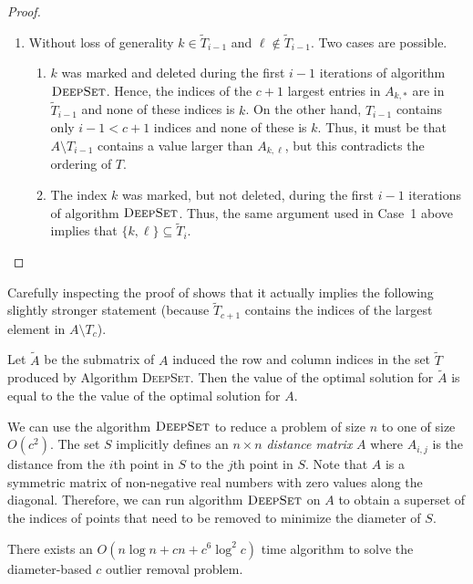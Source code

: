\documentclass[lotsofwhite]{patmorin}
\begin{document}
\begin{proof}
\begin{enumerate}
\item Without loss of generality $k \in \tilde{T}_{i-1}$ and $\ell \not
\in \tilde{T}_{i-1}$. Two cases are possible.

\begin{enumerate}

\item $k$ was marked and deleted during the first $i-1$ iterations of
algorithm $\textsc{DeepSet}$. Hence, the indices of the $c+1$ largest
entries in $A_{k,*}$ are in $\tilde{T}_{i-1}$ and none of these
indices is $k$.  On the other hand, $T_{i-1}$ contains only $i-1 <
c+1$ indices and none of these is $k$.  Thus, it must be that
$A\setminus T_{i-1}$ contains a value larger than $A_{k,\ell}$, but this
contradicts the ordering of $T$.

\item The index $k$ was marked, but not deleted, during the first
$i-1$ iterations of algorithm $\textsc{DeepSet}$.  Thus, the same
argument used in Case~1 above implies that $\{k,\ell\}\subseteq
\tilde{T}_i$.

\end{enumerate}
\end{enumerate}
\end{proof} 

Carefully inspecting the proof of  shows that it
actually implies the following slightly stronger statement (because
$\tilde{T}_{c+1}$ contains the indices of the largest element in
$A\setminus T_c$).

\begin{lem}
Let $\tilde{A}$ be the submatrix of $A$ induced the row and column
indices in the set $\tilde{T}$ produced by Algorithm \textsc{DeepSet}.
Then the value of the optimal solution for $\tilde{A}$ is equal to the
the value of the optimal solution for $A$.
\end{lem}

We can use the algorithm $\textsc{DeepSet}$ to reduce a problem of
size $n$ to one of size $O(c^2)$.  The set $S$ implicitly defines an
$n\times n$ \emph{distance matrix} $A$ where $A_{i,j}$ is the distance
from the $i$th point in $S$ to the $j$th point in $S$.  Note that $A$
is a symmetric matrix of non-negative real numbers with zero values
along the diagonal.  Therefore, we can run algorithm
$\textsc{DeepSet}$ on $A$ to obtain a superset of the indices of
points that need to be removed to minimize the diameter of $S$.

\begin{thm}
There exists an $O(n\log n + cn + c^6\log^2 c)$ time algorithm to
solve the diameter-based $c$ outlier removal problem.
\end{thm}
\end{document}
